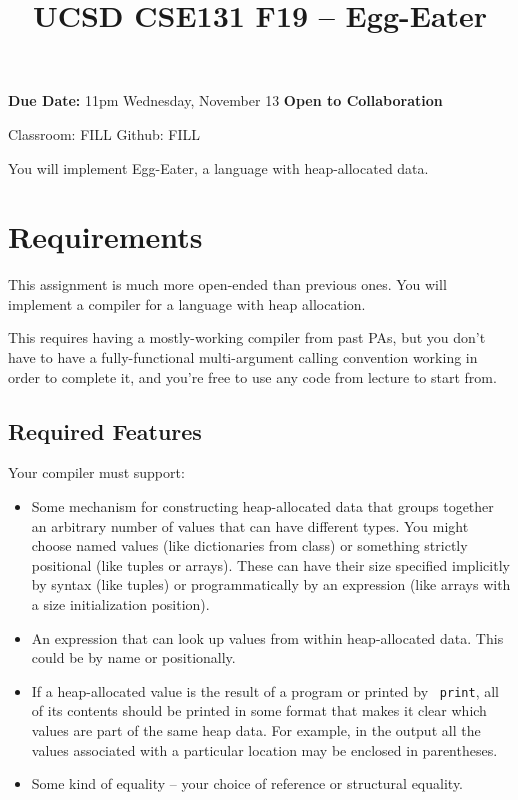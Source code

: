 \documentclass[10pt, oneside]{article}
\title{UCSD CSE131 F19 -- Egg-Eater}
\begin{document}
\maketitle 

{\bf Due Date:} 11pm Wednesday, November 13 \hspace{2em} {\bf Open to Collaboration}

Classroom: FILL \hspace{1em} Github: FILL

You will implement Egg-Eater, a language with heap-allocated data.

\section*{Requirements}

This assignment is much more open-ended than previous ones. You will
implement a compiler for a language with heap allocation.

This requires having a mostly-working compiler from past PAs, but you don't
have to have a fully-functional multi-argument calling convention working in
order to complete it, and you're free to use any code from lecture to start
from.

\subsection*{Required Features}

Your compiler must support:

\begin{itemize}

\item Some mechanism for constructing heap-allocated data that groups
together an arbitrary number of values that can have different types. You
might choose named values (like dictionaries from class) or something
strictly positional (like tuples or arrays). These can have their size
specified implicitly by syntax (like tuples) or programmatically by an
expression (like arrays with a size initialization position).

\item An expression that can look up values from within heap-allocated data.
This could be by name or positionally.

\item If a heap-allocated value is the result of a program or printed by {\tt
print}, all of its contents should be printed in some format that makes it
clear which values are part of the same heap data. For example, in the output
all the values associated with a particular location may be enclosed in
parentheses.

\item Some kind of equality -- your choice of reference or structural equality.
\end{itemize}
\end{document}
